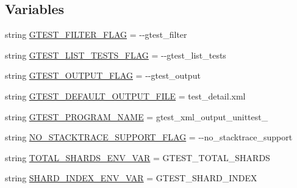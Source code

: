\subsection*{Variables}
\begin{DoxyCompactItemize}
\item 
string \mbox{\hyperlink{namespacegoogletest-master_1_1googletest_1_1test_1_1gtest__xml__output__unittest_a0bd626b3d6a5b6cd217d2e09e367f34e}{G\+T\+E\+S\+T\+\_\+\+F\+I\+L\+T\+E\+R\+\_\+\+F\+L\+AG}} = \textquotesingle{}-\/-\/gtest\+\_\+filter\textquotesingle{}
\item 
string \mbox{\hyperlink{namespacegoogletest-master_1_1googletest_1_1test_1_1gtest__xml__output__unittest_aea483b62493731267da168e0958b1e74}{G\+T\+E\+S\+T\+\_\+\+L\+I\+S\+T\+\_\+\+T\+E\+S\+T\+S\+\_\+\+F\+L\+AG}} = \textquotesingle{}-\/-\/gtest\+\_\+list\+\_\+tests\textquotesingle{}
\item 
string \mbox{\hyperlink{namespacegoogletest-master_1_1googletest_1_1test_1_1gtest__xml__output__unittest_ac8a5dd2279bdc7c0b25afd6e9e719ce3}{G\+T\+E\+S\+T\+\_\+\+O\+U\+T\+P\+U\+T\+\_\+\+F\+L\+AG}} = \textquotesingle{}-\/-\/gtest\+\_\+output\textquotesingle{}
\item 
string \mbox{\hyperlink{namespacegoogletest-master_1_1googletest_1_1test_1_1gtest__xml__output__unittest_abd8eace8011563151297d74eb70e0322}{G\+T\+E\+S\+T\+\_\+\+D\+E\+F\+A\+U\+L\+T\+\_\+\+O\+U\+T\+P\+U\+T\+\_\+\+F\+I\+LE}} = \textquotesingle{}test\+\_\+detail.\+xml\textquotesingle{}
\item 
string \mbox{\hyperlink{namespacegoogletest-master_1_1googletest_1_1test_1_1gtest__xml__output__unittest_a0965a84cceaedb249813aff903293748}{G\+T\+E\+S\+T\+\_\+\+P\+R\+O\+G\+R\+A\+M\+\_\+\+N\+A\+ME}} = \textquotesingle{}gtest\+\_\+xml\+\_\+output\+\_\+unittest\+\_\+\textquotesingle{}
\item 
string \mbox{\hyperlink{namespacegoogletest-master_1_1googletest_1_1test_1_1gtest__xml__output__unittest_aedff93465d4c404f96e7f115cd17c785}{N\+O\+\_\+\+S\+T\+A\+C\+K\+T\+R\+A\+C\+E\+\_\+\+S\+U\+P\+P\+O\+R\+T\+\_\+\+F\+L\+AG}} = \textquotesingle{}-\/-\/no\+\_\+stacktrace\+\_\+support\textquotesingle{}
\item 
string \mbox{\hyperlink{namespacegoogletest-master_1_1googletest_1_1test_1_1gtest__xml__output__unittest_ae8477ef1bc1a654973f9b508fdfcf51e}{T\+O\+T\+A\+L\+\_\+\+S\+H\+A\+R\+D\+S\+\_\+\+E\+N\+V\+\_\+\+V\+AR}} = \textquotesingle{}G\+T\+E\+S\+T\+\_\+\+T\+O\+T\+A\+L\+\_\+\+S\+H\+A\+R\+DS\textquotesingle{}
\item 
string \mbox{\hyperlink{namespacegoogletest-master_1_1googletest_1_1test_1_1gtest__xml__output__unittest_aedaeffda3481ad0782d1aee74aa2731c}{S\+H\+A\+R\+D\+\_\+\+I\+N\+D\+E\+X\+\_\+\+E\+N\+V\+\_\+\+V\+AR}} = \textquotesingle{}G\+T\+E\+S\+T\+\_\+\+S\+H\+A\+R\+D\+\_\+\+I\+N\+D\+EX\textquotesingle{}

\end{DoxyCompactItemize}
